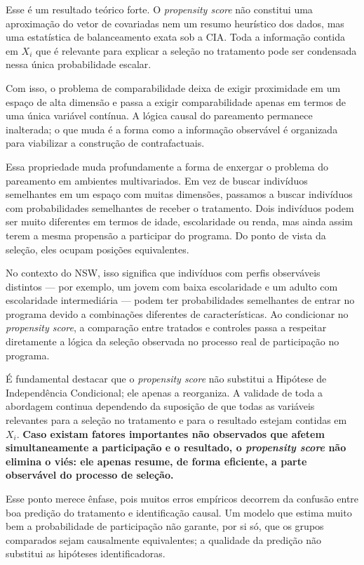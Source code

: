 Esse é um resultado teórico forte. O \textit{propensity score} não constitui uma aproximação do vetor de covariadas nem um resumo heurístico dos dados, mas uma estatística de balanceamento exata sob a CIA. Toda a informação contida em $X_i$ que é relevante para explicar a seleção no tratamento pode ser condensada nessa única probabilidade escalar.

Com isso, o problema de comparabilidade deixa de exigir proximidade em um espaço de alta dimensão e passa a exigir comparabilidade apenas em termos de uma única variável contínua. A lógica causal do pareamento permanece inalterada; o que muda é a forma como a informação observável é organizada para viabilizar a construção de contrafactuais.


Essa propriedade muda profundamente a forma de enxergar o problema do pareamento em ambientes multivariados. Em vez de buscar indivíduos semelhantes em um espaço com muitas dimensões, passamos a buscar indivíduos com probabilidades semelhantes de receber o tratamento. Dois indivíduos podem ser muito diferentes em termos de idade, escolaridade ou renda, mas ainda assim terem a mesma propensão a participar do programa. Do ponto de vista da seleção, eles ocupam posições equivalentes.

No contexto do NSW, isso significa que indivíduos com perfis observáveis distintos — por exemplo, um jovem com baixa escolaridade e um adulto com escolaridade intermediária — podem ter probabilidades semelhantes de entrar no programa devido a combinações diferentes de características. Ao condicionar no \textit{propensity score}, a comparação entre tratados e controles passa a respeitar diretamente a lógica da seleção observada no processo real de participação no programa.

É fundamental destacar que o \textit{propensity score} não substitui a Hipótese de Independência Condicional; ele apenas a reorganiza. A validade de toda a abordagem continua dependendo da suposição de que todas as variáveis relevantes para a seleção no tratamento e para o resultado estejam contidas em $X_i$. \textbf{Caso existam fatores importantes não observados que afetem simultaneamente a participação e o resultado, o \textit{propensity score} não elimina o viés: ele apenas resume, de forma eficiente, a parte observável do processo de seleção.}

Esse ponto merece ênfase, pois muitos erros empíricos decorrem da confusão entre boa predição do tratamento e identificação causal. Um modelo que estima muito bem a probabilidade de participação não garante, por si só, que os grupos comparados sejam causalmente equivalentes; a qualidade da predição não substitui as hipóteses identificadoras.

